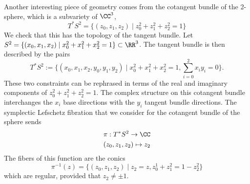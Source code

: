 

    Another interesting piece of geometry comes from the cotangent bundle of the 2-sphere, which is a subvariety of $\CC^{3}$,
    \[T^*S^2=\{(z_0, z_1, z_2)\;|\; z_0^2+z_1^2+z_2^2=1\}\]
    We check that this has the topology of the tangent bundle.
    Let $S^2=\{(x_0, x_1, x_2)\;|\; x_0^2+x_1^2+x_2^2=1\}\subset \RR^3$. 
    The tangent bundle is then described by the pairs 
    \[T^*S^2:=\{(x_0, x_1, x_2, y_0, y_1, y_2)\;|\;x_0^2+x_1^2+x_2^2=1, \sum_{i=0}^2 x_iy_i=0 \}.\]
    These two constraints can be rephrased in terms of the real and imaginary components of $z_0^2+z_1^2+z_2^2=1$. 
    The complex structure on this cotangent bundle interchanges the $x_i$ base directions with the $y_i$ tangent bundle directions.
    The symplectic Lefschetz fibration that we consider for the cotangent bundle of the sphere sends 
    \begin{align*}
        \pi: T^*S^2\to \CC\\
        (z_0, z_1, z_2)\mapsto z_2
    \end{align*}
    The fibers of this function are the conics 
    \[\pi^{-1}(z)=\{(z_0, z_1, z_2)\;|\; z_2=z, z_0^1+z_1^2=1-z_2^2\}\]
    which are regular, provided that $z_2\neq \pm 1$. 


